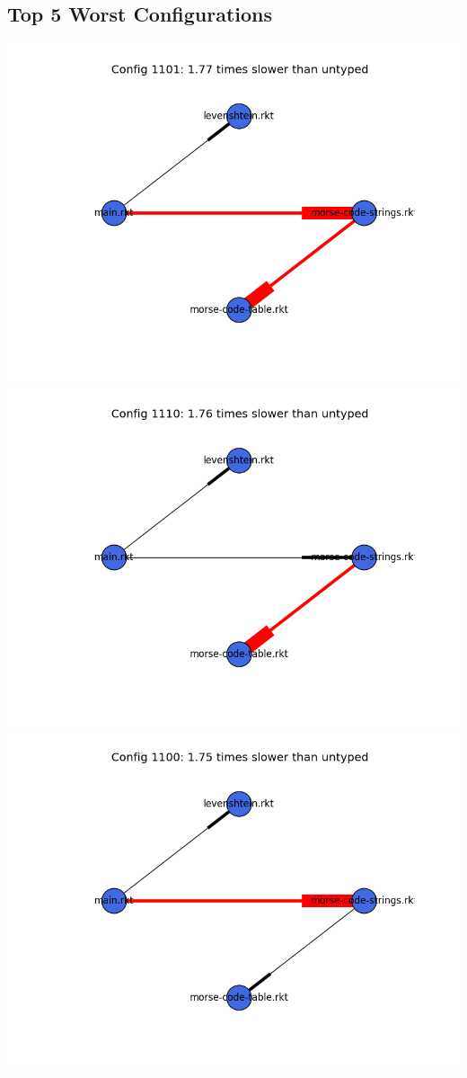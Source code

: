 \documentclass{article}
\begin{document}
\begin{itemize}
\subsection{Top 5 Worst Configurations}
\includegraphics[width=\textwidth]{morse-code-module-graph-1101.png}
\includegraphics[width=\textwidth]{morse-code-module-graph-1110.png}
\includegraphics[width=\textwidth]{morse-code-module-graph-1100.png}

\end{itemize}
\end{document}
